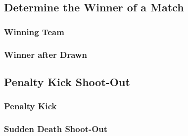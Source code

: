 \subsection{Determine the Winner of a Match}
\subsubsection{Winning Team}
\subsubsection{Winner after Drawn}

\subsection{Penalty Kick Shoot-Out}
\subsubsection{Penalty Kick}
\subsubsection{Sudden Death Shoot-Out}
